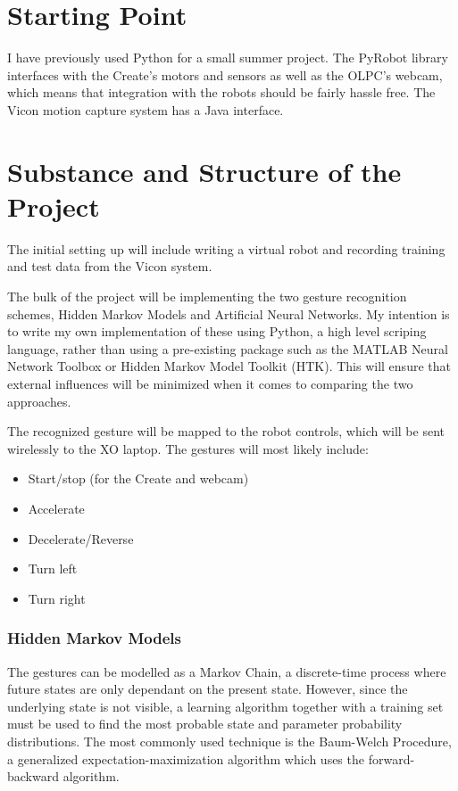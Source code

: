 \section*{Starting Point}

I have previously used Python for a small summer project. The PyRobot library interfaces with the Create's motors and sensors as well as the OLPC's webcam, which means that integration with the robots should be fairly hassle free. The Vicon motion capture system has a Java interface.

\section*{Substance and Structure of the Project}

The initial setting up will include writing a virtual robot and recording training and test data from the Vicon system.

The bulk of the project will be implementing the two gesture recognition schemes, Hidden Markov Models and Artificial Neural Networks. My intention is to write my own implementation of these using Python, a high level scriping language, rather than using a pre-existing package such as the MATLAB Neural Network Toolbox or Hidden Markov Model Toolkit (HTK). This will ensure that external influences will be minimized when it comes to comparing the two approaches.

The recognized gesture will be mapped to the robot controls, which will be sent wirelessly to the XO laptop. The gestures will most likely include:

\begin{itemize}

\item Start/stop (for the Create and webcam)
\item Accelerate
\item Decelerate/Reverse
\item Turn left
\item Turn right

\end{itemize}

\subsubsection*{Hidden Markov Models}
The gestures can be modelled as a Markov Chain, a discrete-time process where future states are only dependant on the present state. However, since the underlying state is not visible, a learning algorithm together with a training set must be used to find the most probable state and parameter probability distributions. The most commonly used technique is the Baum-Welch Procedure, a generalized expectation-maximization algorithm which uses the forward-backward algorithm.

